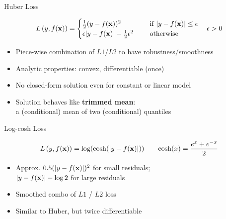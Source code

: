 \documentclass[11pt,compress,t,notes=noshow, xcolor=table]{beamer}
\begin{document}
\begin{frame}{Huber Loss}


$$
L\left(y, f(\mathbf{x})\right) = \begin{cases}
  \frac{1}{2}(y - f(\mathbf{x}))^2  & \text{ if } |y - f(\mathbf{x})| \le \epsilon \\
  \epsilon |y - f(\mathbf{x})|-\frac{1}{2}\epsilon^2 \quad & \text{ otherwise }
  \end{cases} \quad \epsilon > 0
$$

\begin{itemize}
\item Piece-wise combination of $L1$/$L2$ to have robustness/smoothness
\item Analytic properties: convex, differentiable (once)
\end{itemize}




\begin{itemize}
\item No closed-form solution even for constant or linear model
\item Solution behaves like \textbf{trimmed mean}:\\
a (conditional) mean of two (conditional) quantiles  
\end{itemize}

\end{frame}

\begin{frame}{Log-cosh Loss }


$$
L\left(y, f(\mathbf{x})\right) = \log ( \cosh(\left|y - f(\mathbf{x})\right|) ) \qquad \text{cosh}(x)=\frac{e^x+e^{-x}}{2}
$$

\vfill

\begin{itemize}
\item Approx. $0.5 (\left|y - f(\mathbf{x})\right|)^2$ for small residuals;\\
$\left|y - f(\mathbf{x})\right| - \log 2$ for large residuals
\item Smoothed combo of $L1$ / $L2$ loss
\item Similar to Huber, but twice differentiable
\end{itemize}

\vfill




\end{frame}
\end{document}
